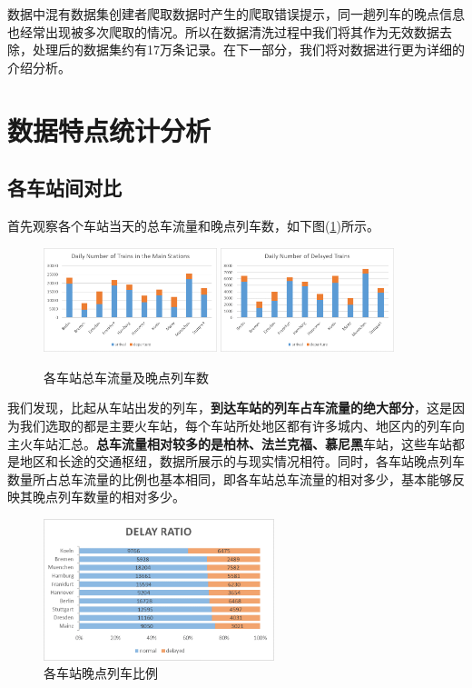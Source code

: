 \documentclass[lang=cn,12pt,a4paper,cite=authoryear]{elegantpaper}
\begin{document}
数据中混有数据集创建者爬取数据时产生的爬取错误提示，同一趟列车的晚点信息也经常出现被多次爬取的情况。所以在数据清洗过程中我们将其作为无效数据去除，处理后的数据集约有17万条记录。在下一部分，我们将对数据进行更为详细的介绍分析。

\section{数据特点统计分析}

\subsection{各车站间对比}

首先观察各个车站当天的总车流量和晚点列车数，如下图(\ref{fig1})所示。

\begin{figure}[H]
	\centering
	\includegraphics[width=0.45\textwidth]{image/num.png}
	\quad
	\includegraphics[width=0.45\textwidth]{image/delay_num.png}
	\caption{各车站总车流量及晚点列车数}
	\label{fig1}
\end{figure}

我们发现，比起从车站出发的列车，\textbf{到达车站的列车占车流量的绝大部分}，这是因为我们选取的都是主要火车站，每个车站所处地区都有许多城内、地区内的列车向主火车站汇总。\textbf{总车流量相对较多的是柏林、法兰克福、慕尼黑}车站，这些车站都是地区和长途的交通枢纽，数据所展示的与现实情况相符。同时，各车站晚点列车数量所占总车流量的比例也基本相同，即各车站总车流量的相对多少，基本能够反映其晚点列车数量的相对多少。

\begin{figure}[H]
	\centering
	\includegraphics[width=0.6\textwidth]{image/delay_ratio.png}
	\caption{各车站晚点列车比例}
	\label{fig2}
\end{figure}
\end{document}

